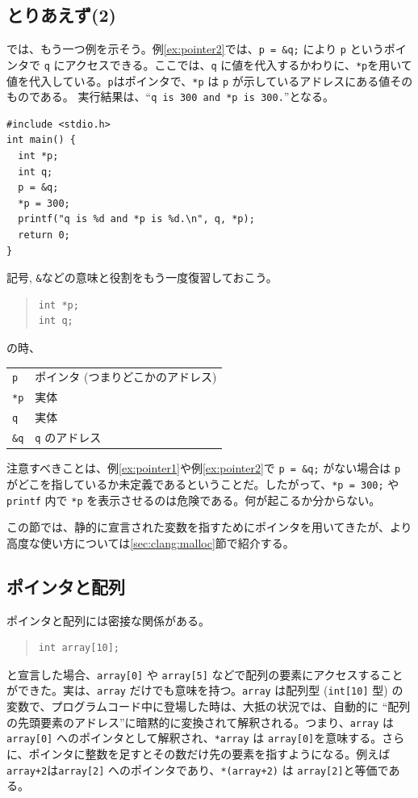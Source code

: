 \subsection{とりあえず(2)}
では、もう一つ例を示そう。例\ref{ex:pointer2}では、\verb|p = &q;| により \verb|p| というポインタで \verb|q| にアクセスできる。ここでは、\verb|q| に値を代入するかわりに、\verb|*p|を用いて値を代入している。\verb|p|はポインタで、\verb|*p| は \verb|p| が示しているアドレスにある値そのものである。
実行結果は、``{\tt q is 300 and *p is 300.}''となる。
\begin{reidai}\label{ex:pointer2}
\begin{verbatim}
#include <stdio.h>
int main() {
  int *p;
  int q;
  p = &q;
  *p = 300;
  printf("q is %d and *p is %d.\n", q, *p);
  return 0;
}
\end{verbatim}
\end{reidai} \noindent
記号{\tt *}, {\tt \&}などの意味と役割をもう一度復習しておこう。
\begin{quote}
\begin{verbatim}
int *p;
int q;
\end{verbatim}
\end{quote}
の時、
\begin{table}[H]
\begin{center}
\begin{tabular}{ll}
  \verb|p|  &ポインタ (つまりどこかのアドレス)\\
  \verb|*p| &実体\\
  \verb|q|  &実体\\
  \verb|&q| &\verb|q| のアドレス
\end{tabular}
\end{center}
\end{table} \noindent
注意すべきことは、例\ref{ex:pointer1}や例\ref{ex:pointer2}で \verb|p = &q;| がない場合は \verb|p| がどこを指しているか未定義であるということだ。したがって、\verb|*p = 300;| や \verb|printf| 内で \verb|*p| を表示させるのは危険である。何が起こるか分からない。

この節では、静的に宣言された変数を指すためにポインタを用いてきたが、より高度な使い方については\ref{sec:clang:malloc}節で紹介する。

\subsection{ポインタと配列}
\label{sec:C:pointer-array}
ポインタと配列には密接な関係がある。
\begin{quote}
\begin{verbatim}
int array[10];
\end{verbatim}
\end{quote}
と宣言した場合、\verb|array[0]| や \verb|array[5]| などで配列の要素にアクセスすることができた。実は、\verb|array| だけでも意味を持つ。\verb|array| は配列型 (\verb|int[10]| 型) の変数で、プログラムコード中に登場した時は、大抵の状況では、自動的に ``配列の先頭要素のアドレス''に暗黙的に変換されて解釈される。つまり、\verb|array| は \verb|array[0]| へのポインタとして解釈され、\verb|*array| は \verb|array[0]|を意味する。さらに、ポインタに整数を足すとその数だけ先の要素を指すようになる。例えば\verb|array+2|は\verb|array[2]| へのポインタであり、\verb|*(array+2)| は \verb|array[2]|と等価である。

